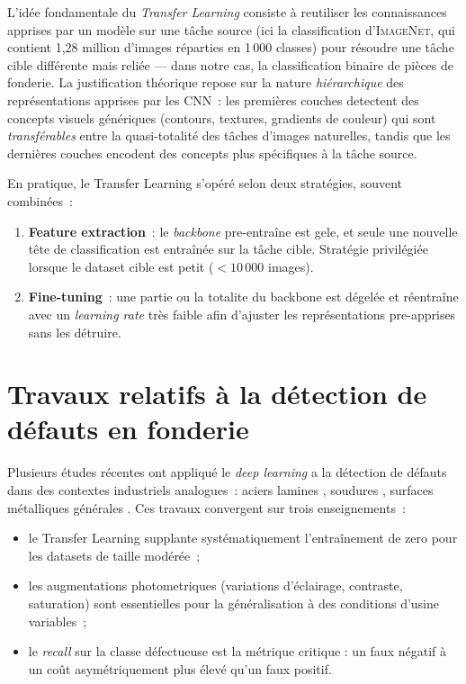 \documentclass[12pt,a4paper,openany]{report}
\begin{document}
L'idée fondamentale du \emph{Transfer Learning} \cite{pan2010,yosinski2014} consiste à reutiliser les connaissances apprises par un modèle sur une tâche source (ici la classification d'\textsc{ImageNet}, qui contient 1{,}28 million d'images réparties en 1\,000 classes) pour résoudre une tâche cible différente mais reliée --- dans notre cas, la classification binaire de pièces de fonderie. La justification théorique repose sur la nature \emph{hiérarchique} des représentations apprises par les CNN~: les premières couches detectent des concepts visuels génériques (contours, textures, gradients de couleur) qui sont \emph{transférables} entre la quasi-totalité des tâches d'images naturelles, tandis que les dernières couches encodent des concepts plus spécifiques à la tâche source.

En pratique, le Transfer Learning s'opéré selon deux stratégies, souvent combinées~:

\begin{enumerate}
    \item \textbf{Feature extraction}~: le \emph{backbone} pre-entraîne est gele, et seule une nouvelle tête de classification est entraînée sur la tâche cible. Stratégie privilégiée lorsque le dataset cible est petit ($<10\,000$ images).
    \item \textbf{Fine-tuning}~: une partie ou la totalite du backbone est dégelée et réentraîne avec un \emph{learning rate} très faible afin d'ajuster les représentations pre-apprises sans les détruire.
\end{enumerate}

\section{Travaux relatifs à la détection de défauts en fonderie}

Plusieurs études récentes ont appliqué le \emph{deep learning} a la détection de défauts dans des contextes industriels analogues~: aciers lamines \cite{he2019}, soudures \cite{yang2020}, surfaces métalliques générales \cite{tabernik2020}. Ces travaux convergent sur trois enseignements~:
\begin{itemize}
    \item le Transfer Learning supplante systématiquement l'entraînement de zero pour les datasets de taille modérée~;
    \item les augmentations photometriques (variations d'éclairage, contraste, saturation) sont essentielles pour la généralisation à des conditions d'usine variables~;
    \item le \emph{recall} sur la classe défectueuse est la métrique critique : un faux négatif à un coût asymétriquement plus élevé qu'un faux positif.
\end{itemize}
\end{document}
